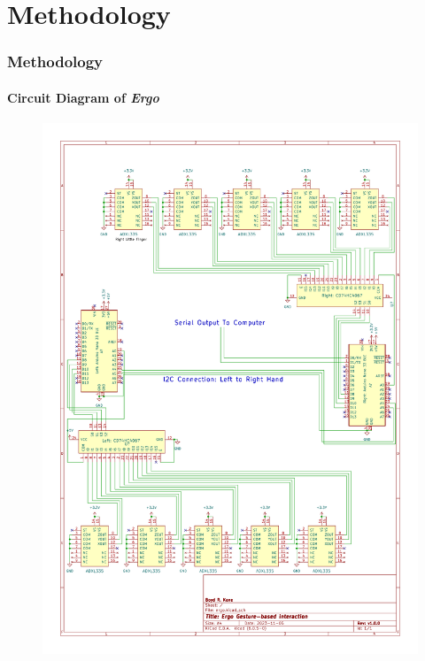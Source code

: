 \documentclass[xcolor={svgnames,table},10pt,fleqn]{beamer}
\begin{document}
\section{Methodology}
\begin{frame}
    \frametitle{Methodology}
    \framesubtitle{Circuit Diagram of \emph{Ergo}}
    \begin{figure}[h]
        \centering
        \includegraphics[height=0.8\textheight]{ergo_schematic.pdf}
    \end{figure}
\end{frame}
\end{document}
